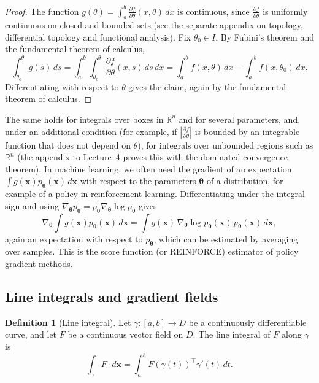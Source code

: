 \documentclass[11pt]{article}
\theoremstyle{definition}
\newtheorem{definition}{Definition}[section]
\theoremstyle{plain}
\theoremstyle{remark}
\begin{document}
\begin{proof}
    The function $g(\theta) = \int_a^b \frac{\partial f}{\partial\theta}(x, \theta)\, dx$ is continuous, since $\frac{\partial f}{\partial\theta}$ is uniformly continuous on closed and bounded sets (see the separate appendix on topology, differential topology and functional analysis). Fix $\theta_0 \in I$. By Fubini's theorem and the fundamental theorem of calculus,
    \[\int_{\theta_0}^\theta g(s)\, ds = \int_a^b \int_{\theta_0}^\theta \frac{\partial f}{\partial\theta}(x, s)\, ds\, dx = \int_a^b f(x, \theta)\, dx - \int_a^b f(x, \theta_0)\, dx.\]
    Differentiating with respect to $\theta$ gives the claim, again by the fundamental theorem of calculus.
\end{proof}

The same holds for integrals over boxes in $\mathbb{R}^n$ and for several parameters, and, under an additional condition (for example, if $|\frac{\partial f}{\partial\theta}|$ is bounded by an integrable function that does not depend on $\theta$), for integrals over unbounded regions such as $\mathbb{R}^n$ (the appendix to Lecture~4 proves this with the dominated convergence theorem). In machine learning, we often need the gradient of an expectation $\int g(\mathbf{x})p_{\boldsymbol{\theta}}(\mathbf{x})\, d\mathbf{x}$ with respect to the parameters $\boldsymbol{\theta}$ of a distribution, for example of a policy in reinforcement learning. Differentiating under the integral sign and using $\nabla_{\boldsymbol{\theta}}p_{\boldsymbol{\theta}} = p_{\boldsymbol{\theta}}\nabla_{\boldsymbol{\theta}}\log p_{\boldsymbol{\theta}}$ gives
\[\nabla_{\boldsymbol{\theta}}\int g(\mathbf{x})p_{\boldsymbol{\theta}}(\mathbf{x})\, d\mathbf{x} = \int g(\mathbf{x})\,\nabla_{\boldsymbol{\theta}}\log p_{\boldsymbol{\theta}}(\mathbf{x})\,p_{\boldsymbol{\theta}}(\mathbf{x})\, d\mathbf{x},\]
again an expectation with respect to $p_{\boldsymbol{\theta}}$, which can be estimated by averaging over samples. This is the score function (or REINFORCE) estimator of policy gradient methods.

\subsection{Line integrals and gradient fields}

\begin{definition}[Line integral]\label{def:line-integral}
    Let $\gamma: [a, b] \to D$ be a continuously differentiable curve, and let $F$ be a continuous vector field on $D$. The line integral of $F$ along $\gamma$ is
    \[\int_\gamma F \cdot d\mathbf{x} = \int_a^b F(\gamma(t))^\top\gamma'(t)\, dt.\]
\end{definition}
\end{document}
